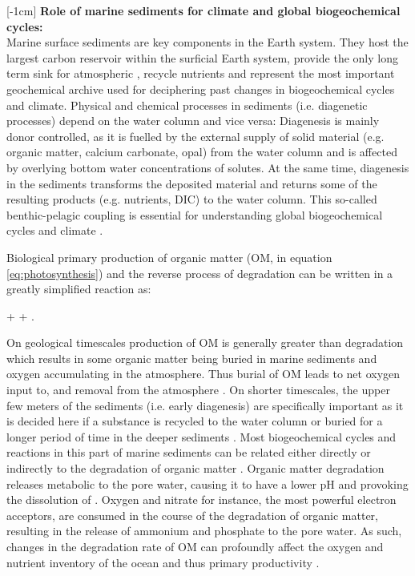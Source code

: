 \documentclass[gmd, manuscript]{copernicus}
\begin{document}
\introduction  %
[-1cm]%
\textbf{Role of marine sediments for climate and global biogeochemical cycles:}\\
Marine surface sediments are key components in the Earth system. They host the largest carbon reservoir within the surficial Earth system, provide the only long term sink for atmospheric , 
recycle nutrients and represent the most important geochemical archive used for deciphering past changes in biogeochemical cycles and climate. 
Physical and chemical processes in sediments (i.e. diagenetic processes) depend on the water column and vice versa: Diagenesis is mainly donor controlled, as it is fuelled by the external supply of solid material 
(e.g. organic matter, calcium carbonate, opal) from the water column and is affected by overlying bottom water concentrations of solutes. 
At the same time, diagenesis in the sediments transforms the deposited material and returns some of the resulting products (e.g. nutrients, DIC) to the water column. 
This so-called benthic-pelagic coupling is essential for understanding global biogeochemical cycles and climate \citep[e.g.][]{archer_effect_1994, soetaert_coupling_2000, archer_what_2000, mackenzie_sediments_2005}. 

Biological primary production of organic matter (OM,  in equation \ref{eq:photosynthesis}) and the reverse process of degradation can be written in a greatly simplified reaction as:
\begin{reaction}
+ \rightleftharpoons {} + .\label{eq:photosynthesis}
\end{reaction}
On geological timescales production of OM is generally greater than degradation which results in some organic matter being buried in marine sediments and oxygen accumulating in the atmosphere. 
Thus burial of OM leads to net oxygen input to, and  removal from the atmosphere \citep{berner_phanerozoic_2004}. 
On shorter timescales, the upper few meters of the sediments (i.e. early diagenesis) are specifically important as it is decided here if a substance is recycled to the water column or buried for a longer period of time in the 
deeper sediments \citep{hensen_benthic_2006}. 
Most biogeochemical cycles and reactions in this part of marine sediments can be related either directly or indirectly to the degradation of organic matter \citep[e.g][]{boudreau_reactive_1991, arndt_quantifying_2013}. 
Organic matter degradation releases metabolic  to the pore water, causing it to have a lower pH and provoking the dissolution of  \citep{emerson_carbon_1981}.
Oxygen and nitrate for instance, the most powerful electron acceptors, are consumed in the course of the degradation of organic matter, resulting in the release of ammonium and phosphate to the pore water. 
As such, changes in the degradation rate of OM can profoundly affect the oxygen and nutrient inventory of the ocean and thus primary productivity \citep{van_cappellen_benthic_1994, lenton_redfield_2000}. 
\end{document}
